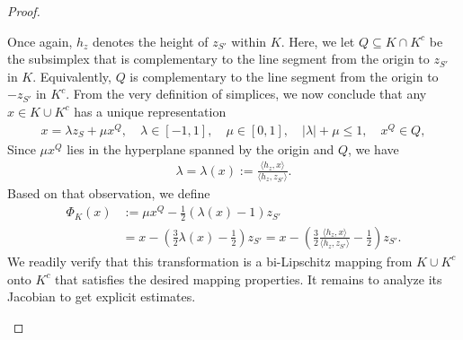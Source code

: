 \documentclass[10pt,a4paper]{article}
\begin{document}
\begin{proof}
\begin{itemize}
        Once again, $h_{z}$ denotes the height of $z_{S'}$ within $K$.
        Here, we let $Q \subseteq K \cap K^{c}$ be the subsimplex 
        that is complementary to the line segment from the origin to $z_{S'}$ in $K$.
        Equivalently, $Q$ is complementary to the line segment from the origin to $-z_{S'}$ in $K^{c}$.
        From the very definition of simplices, we now conclude that any $x \in K \cup K^{c}$ 
        has a unique representation
        \begin{align*}
            x = \lambda z_{S} + \mu x^{Q}, \quad \lambda \in [-1,1], \quad \mu \in [0,1], \quad |\lambda| + \mu \leq 1, \quad x^{Q} \in Q,
        \end{align*}
        Since $\mu x^{Q}$ lies in the hyperplane spanned by the origin and $Q$, we have 
        \begin{align*}
            \lambda = \lambda(x) := \frac{\langle h_{z},x\rangle}{\langle h_{z},z_{S'}\rangle} 
            .
        \end{align*}
        Based on that observation, we define 
        \begin{align*}
            \Phi_{K}(x) 
            &
            := 
            \mu x^{Q} - \frac 1 2 \left( \lambda(x) - 1 \right) z_{S'}
            \\&
            = 
            x - \left( \frac 3 2 \lambda(x) - \frac 1 2 \right) z_{S'}
            = 
            x - \left( \frac 3 2 \frac{\langle h_{z},x\rangle}{\langle h_{z},z_{S'}\rangle} - \frac 1 2 \right) z_{S'}
            .
        \end{align*}
        We readily verify that this transformation is a bi-Lipschitz mapping from $K \cup K^{c}$ onto $K^{c}$
        that satisfies the desired mapping properties. 
        It remains to analyze its Jacobian to get explicit estimates. 
        

\end{itemize}
\end{proof}
\end{document}
